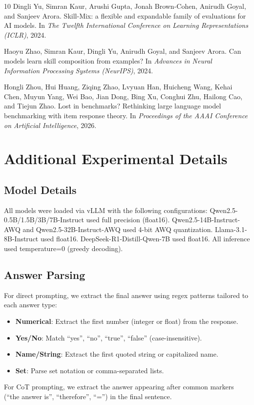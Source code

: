 \documentclass{article}
\begin{document}
\begin{thebibliography}{10}
Dingli Yu, Simran Kaur, Arushi Gupta, Jonah Brown-Cohen, Anirudh Goyal, and Sanjeev Arora.
\newblock Skill-{M}ix: a flexible and expandable family of evaluations for {AI} models.
\newblock In \emph{The Twelfth International Conference on Learning Representations (ICLR)}, 2024.

Haoyu Zhao, Simran Kaur, Dingli Yu, Anirudh Goyal, and Sanjeev Arora.
\newblock Can models learn skill composition from examples?
\newblock In \emph{Advances in Neural Information Processing Systems (NeurIPS)}, 2024.

Hongli Zhou, Hui Huang, Ziqing Zhao, Lvyuan Han, Huicheng Wang, Kehai Chen, Muyun Yang, Wei Bao, Jian Dong, Bing Xu, Conghui Zhu, Hailong Cao, and Tiejun Zhao.
\newblock Lost in benchmarks? {R}ethinking large language model benchmarking with item response theory.
\newblock In \emph{Proceedings of the AAAI Conference on Artificial Intelligence}, 2026.

\end{thebibliography}

\appendix
\section{Additional Experimental Details}

\subsection{Model Details}
All models were loaded via vLLM with the following configurations: Qwen2.5-0.5B/1.5B/3B/7B-Instruct used full precision (float16). Qwen2.5-14B-Instruct-AWQ and Qwen2.5-32B-Instruct-AWQ used 4-bit AWQ quantization. Llama-3.1-8B-Instruct used float16. DeepSeek-R1-Distill-Qwen-7B used float16. All inference used temperature=0 (greedy decoding).

\subsection{Answer Parsing}
For direct prompting, we extract the final answer using regex patterns tailored to each answer type:
\begin{itemize}
    \item \textbf{Numerical}: Extract the first number (integer or float) from the response.
    \item \textbf{Yes/No}: Match ``yes'', ``no'', ``true'', ``false'' (case-insensitive).
    \item \textbf{Name/String}: Extract the first quoted string or capitalized name.
    \item \textbf{Set}: Parse set notation or comma-separated lists.
\end{itemize}
For CoT prompting, we extract the answer appearing after common markers (``the answer is'', ``therefore'', ``='') in the final sentence.
\end{document}
